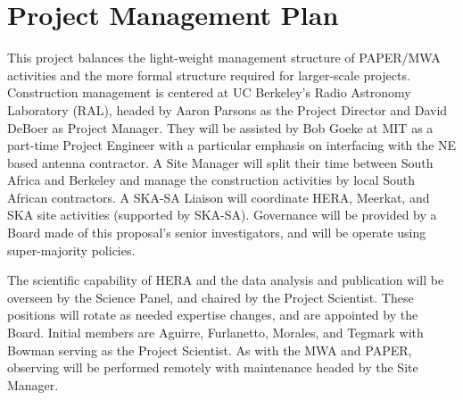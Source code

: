 \documentclass[preprint]{aastex}
\begin{document}
%
%
%
%
%
%
%

\vspace{-0.25in}
\section{Project Management Plan}
\label{PMPsec}

This project balances the light-weight
management structure of PAPER/MWA activities and the more formal structure
required for larger-scale projects. Construction management is centered at UC Berkeley's Radio Astronomy Laboratory (RAL), headed by Aaron Parsons as the Project Director and David DeBoer as Project Manager. They will be assisted by Bob Goeke at MIT as a part-time Project Engineer with a particular emphasis on interfacing with the NE based antenna contractor.
A Site Manager will split their time between South Africa and Berkeley and manage the construction activities by local South African contractors. A SKA-SA Liaison will coordinate HERA, Meerkat, and SKA site activities (supported by SKA-SA). Governance will be provided by a Board made of this proposal's senior investigators, and will be operate using super-majority policies. 

The scientific capability of HERA and the data analysis and publication will be overseen by the Science Panel, and chaired by the Project Scientist. These positions will rotate as needed expertise changes, and are appointed by the Board. Initial members are Aguirre, Furlanetto, Morales, and Tegmark with Bowman serving as the Project Scientist. As with the MWA and PAPER, observing will be performed remotely with maintenance headed by the Site Manager.
\end{document}
